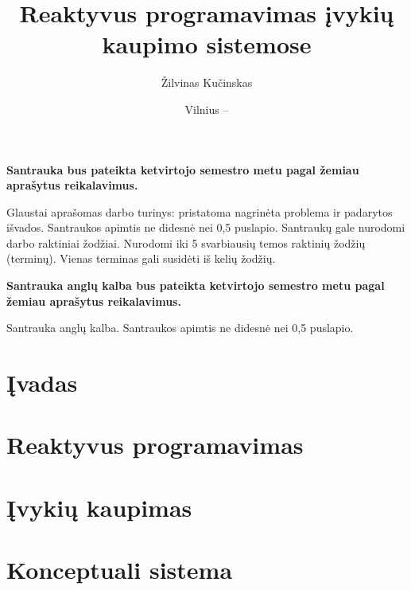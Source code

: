 \documentclass{VUMIFPSmagistrinis}
\title{Reaktyvus programavimas įvykių kaupimo sistemose}
\author{Žilvinas Kučinskas}
\date{Vilnius – \the\year}
\begin{document}
\maketitle



\textbf{Santrauka bus pateikta ketvirtojo semestro metu pagal žemiau aprašytus reikalavimus.}

Glaustai aprašomas darbo turinys: pristatoma nagrinėta problema ir padarytos
išvados. Santraukos apimtis ne didesnė nei 0,5 puslapio. Santraukų gale
nurodomi darbo raktiniai žodžiai.
Nurodomi iki 5 svarbiausių temos raktinių žodžių (terminų).
Vienas terminas gali susidėti iš kelių žodžių.


\textbf{Santrauka anglų kalba bus pateikta ketvirtojo semestro metu pagal žemiau aprašytus reikalavimus.}

Santrauka anglų kalba. Santraukos apimtis ne didesnė nei 0,5 puslapio.

\tableofcontents

\section{Įvadas}


\section{Reaktyvus programavimas}


\section{Įvykių kaupimas}


\section{Konceptuali sistema}

\end{document}
